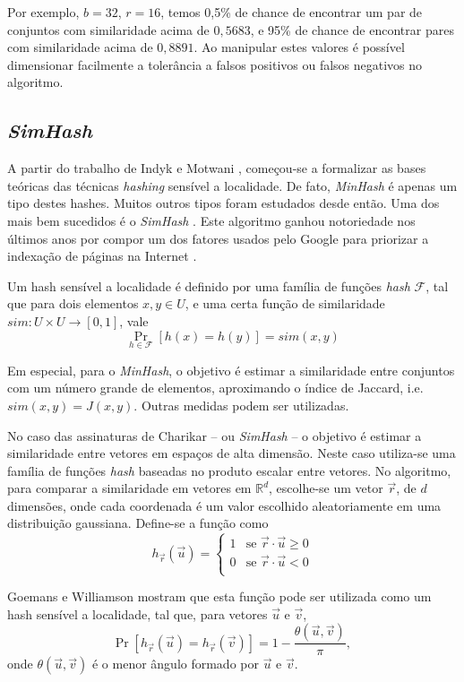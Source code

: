 Por exemplo, $b=32$, $r=16$, temos 0,5\% de chance de encontrar um par de conjuntos com similaridade acima de $0,5683$, e 95\% de chance de encontrar pares com similaridade acima de $0,8891$. Ao manipular estes valores é possível dimensionar facilmente a tolerância a falsos positivos ou falsos negativos no algoritmo.

\subsection{\emph{SimHash}}

A partir do trabalho de Indyk e Motwani \cite{indyk1998approximate,gionis1999similarity}, começou-se a formalizar as bases teóricas das técnicas \emph{hashing} sensível a localidade. De fato, \emph{MinHash} é apenas um tipo destes hashes. Muitos outros tipos foram estudados desde então. Uma dos mais bem sucedidos é o \emph{SimHash} \cite{charikar2002similarity}. Este algoritmo ganhou notoriedade nos últimos anos por compor um dos fatores usados pelo Google para priorizar a indexação de páginas na Internet \cite{manku2007detecting}.

Um hash sensível a localidade é definido por uma família de funções \emph{hash} $\mathcal{F}$, tal que para dois elementos $x, y \in U$, e uma certa função de similaridade $sim: U \times U \to [0, 1]$, vale
\[
    \Pr_{h \in \mathcal{F}}[h(x) = h(y)] = sim(x, y)
\]

Em especial, para o \emph{MinHash}, o objetivo é estimar a similaridade entre conjuntos com um número grande de elementos, aproximando o índice de Jaccard, i.e. $sim(x, y) = J(x, y)$. Outras medidas podem ser utilizadas. 

No caso das assinaturas de Charikar -- ou \emph{SimHash} -- o objetivo é estimar a similaridade entre vetores em espaços de alta dimensão. Neste caso utiliza-se uma família de funções \emph{hash} baseadas no produto escalar entre vetores. No algoritmo, para comparar a similaridade em vetores em $\mathds{R}^d$, escolhe-se um vetor $\vec{r}$, de $d$ dimensões, onde cada coordenada é um valor escolhido aleatoriamente em uma distribuição gaussiana. Define-se a função como \[
    h_{\vec{r}}(\vec{u}) = \begin{cases} 
        1 & \text{se } \vec{r} \cdot \vec{u} \geq 0 \\
        0 & \text{se } \vec{r} \cdot \vec{u} < 0 \\
    \end{cases}
\]

Goemans e Williamson \cite{goemans1995improved} mostram que esta função pode ser utilizada como um hash sensível a localidade, tal que, para vetores $\vec{u}$ e $\vec{v}$,
\[
    \Pr[h_{\vec{r}}(\vec{u}) = h_{\vec{r}}(\vec{v})] = 1 - \frac{\theta(\vec{u}, \vec{v})}{\pi}\text{, }
\] 
onde $\theta(\vec{u}, \vec{v})$ é o menor ângulo formado por $\vec{u}$ e $\vec{v}$.

